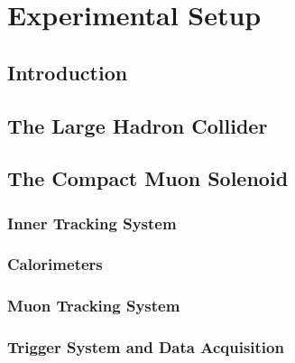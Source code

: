 
\chapter{Experimental Setup}
\label{chap:exp}

\section{Introduction}

\section{The Large Hadron Collider}
\label{sec:LHC}

\section{The Compact Muon Solenoid}
\label{sec:CMS}

\subsection{Inner Tracking System}
\label{subsec:tracking}

\subsection{Calorimeters}
\label{subsec:calorimeter}

\subsection{Muon Tracking System}
\label{subsec:muonTrack}

\subsection{Trigger System and Data Acquisition}
\label{subsec:trigger}
